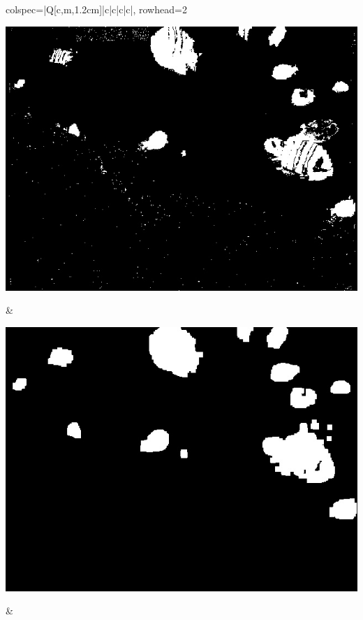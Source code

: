 \begin{longtblr}[
            caption = {Hasil uji coba proses \textit{background subtraction} menggunakan GMM yang disempurnakan oleh Operasi Morfologi},
            label = {tab:gmm_morph_9908}
        ]{
            colspec={|Q[c,m,1.2cm]|c|c|c|c|},
            rowhead=2
        }
\begin{minipage}{0.19\textwidth}
                \includegraphics[width=\linewidth]{image/gt_124/gt_124_gmm_frame705.jpg}
            \end{minipage} & 
            \begin{minipage}{0.19\textwidth}
                \includegraphics[width=\linewidth]{image/gt_124/gt_124_dilated_3x9_frame705.jpg}
            \end{minipage} &
            \begin{minipage}{0.19\textwidth}

\end{minipage}
\end{longtblr}
